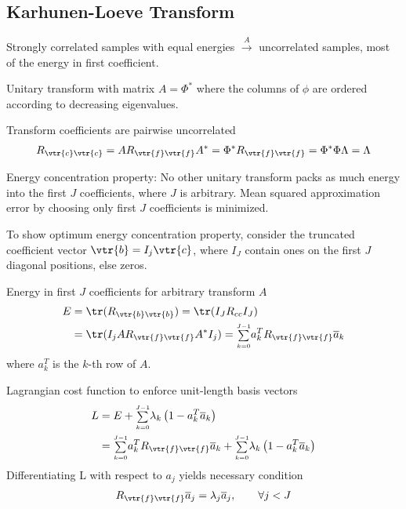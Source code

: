 \begin{compactdesc}
		\section{Karhunen-Loeve Transform}
		Strongly correlated samples with equal energies $\xrightarrow{A}$ uncorrelated samples, most of the energy in first coefficient.
	\item[\lp{Properties}]
		\begin{inparaenum}[\itshape(1)]
			\item Unitary transform with matrix $A=\Phi^*$ where the columns of $\phi$ are ordered according to decreasing eigenvalues.
			\item Transform coefficients are pairwise uncorrelated
				\begin{gather*}
					R_{\vtr{c}\vtr{c}}=AR_{\vtr{f}\vtr{f}}A^*=\Phi^*R_{\vtr{f}\vtr{f}}=\Phi^*\Phi\Lambda=\Lambda
				\end{gather*}
			\item Energy concentration property: No other unitary transform packs as much energy into the first $J$ coefficients, where $J$ is arbitrary. Mean squared approximation error by choosing only first $J$ coefficients is minimized.
		\end{inparaenum}
	\item[\lp{Optimal energy concentration}]
		\begin{inparaenum}[\itshape(1)]
		\item To show optimum energy concentration property, consider the truncated coefficient vector $\vtr{b}=I_j\vtr{c}$, where $I_J$ contain ones on the first $J$ diagonal positions, else zeros.
		\item Energy in first $J$ coefficients for arbitrary transform $A$
			\begin{align*}
				E&=\tr(R_{\vtr{b}\vtr{b}})=\tr(I_JR_{cc}I_J)\\
				&=\tr(I_jAR_{\vtr{f}\vtr{f}}A^*I_j)={\scriptstyle\sum\limits_{k=0}^{J-1}}a_{k}^TR_{\vtr{f}\vtr{f}}\overline{a}_k
			\end{align*}
			where $a_k^T$ is the $k$-th row of $A$.
		\item Lagrangian cost function to enforce unit-length basis vectors
			\begin{align*}
				L&=E+{\scriptstyle\sum\limits_{k=0}^{J-1}}\lambda_k\left( 1-a_{k}^{T}\overline{a}_k \right)\\
				&={\scriptstyle\sum\limits_{k=0}^{J-1}}a_{k}^{T}R_{\vtr{f}\vtr{f}}\overline{a}_k+{\scriptstyle\sum\limits_{k=0}^{J-1}}\lambda_k\left( 1-a_{k}^{T}\overline{a}_{k} \right)
			\end{align*}
			Differentiating L with respect to $a_j$ yields necessary condition
			\begin{gather*}
				R_{\vtr{f}\vtr{f}}\overline{a}_{j}=\lambda_j\overline{a}_j,\qquad \forall j<J
			\end{gather*}
		\end{inparaenum}

\end{compactdesc}
